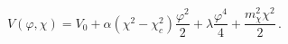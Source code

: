 \begin{equation}                                                \label{4}
  V(\varphi ,\chi){=} V_0{+}\alpha\left(\chi ^2{-}\chi _c^2\right)
  \frac{\varphi^2}{2}+\lambda\frac{\varphi ^4}{4}+ \frac{m_\chi ^2\chi ^2}{2}\,.
\end{equation}

